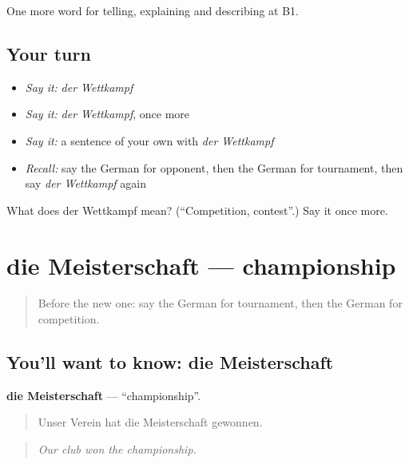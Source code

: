 \begin{grammarlens}[title={What you've built}]
One more word for telling, explaining and describing at B1.
\end{grammarlens}

\subsection*{Your turn}
\begin{itemize}
\raggedright
  \item \emph{Say it:} \emph{der Wettkampf}
  \item \emph{Say it:} \emph{der Wettkampf}, once more
  \item \emph{Say it:} a sentence of your own with \emph{der Wettkampf}
  \item \emph{Recall:} say the German for opponent, then the German for tournament, then say \emph{der Wettkampf} again
\end{itemize}

\begin{tcolorbox}[breakable,colback=teal!4,colframe=teal!35!black,title={Before you move on}]
What does der Wettkampf mean? (\textquotedblleft{}Competition, contest\textquotedblright{}.) Say it once more.
\end{tcolorbox}
\section[die Meisterschaft]{die Meisterschaft — championship}

\label{lesson:GE-C509-meisterschaft}



\begin{quote}
Before the new one: say the German for tournament, then the German for competition.
\end{quote}

\subsection*{You'll want to know: die Meisterschaft}
\textbf{die Meisterschaft} — \textquotedblleft{}championship\textquotedblright{}.

\begin{quote}
Unser Verein hat die Meisterschaft gewonnen.
\end{quote}

\begin{quote}
\emph{Our club won the championship.}
\end{quote}

